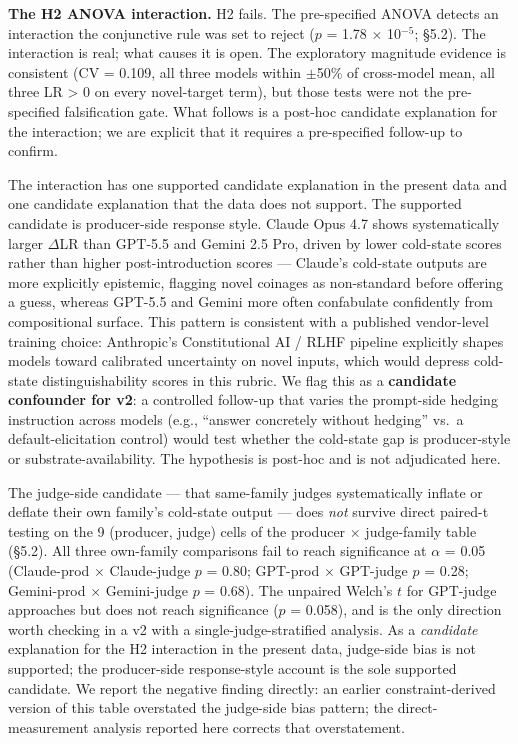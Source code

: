 \documentclass[11pt,a4paper]{article}
\begin{document}
\textbf{The H2 ANOVA interaction.} H2 fails. The pre-specified ANOVA detects an interaction the conjunctive rule was set to reject ($p$ = 1.78 $\times$ 10$^{-5}$; \S5.2). The interaction is real; what causes it is open. The exploratory magnitude evidence is consistent (CV = 0.109, all three models within $\pm$50\% of cross-model mean, all three LR > 0 on every novel-target term), but those tests were not the pre-specified falsification gate. What follows is a post-hoc candidate explanation for the interaction; we are explicit that it requires a pre-specified follow-up to confirm.

The interaction has one supported candidate explanation in the present data and one candidate explanation that the data does not support. The supported candidate is producer-side response style. Claude Opus 4.7 shows systematically larger $\Delta$LR than GPT-5.5 and Gemini 2.5 Pro, driven by lower cold-state scores rather than higher post-introduction scores --- Claude's cold-state outputs are more explicitly epistemic, flagging novel coinages as non-standard before offering a guess, whereas GPT-5.5 and Gemini more often confabulate confidently from compositional surface. This pattern is consistent with a published vendor-level training choice: Anthropic's Constitutional AI / RLHF pipeline \citep{bai2022constitutional} explicitly shapes models toward calibrated uncertainty on novel inputs, which would depress cold-state distinguishability scores in this rubric. We flag this as a \textbf{candidate confounder for v2}: a controlled follow-up that varies the prompt-side hedging instruction across models (e.g., ``answer concretely without hedging'' vs.\ a default-elicitation control) would test whether the cold-state gap is producer-style or substrate-availability. The hypothesis is post-hoc and is not adjudicated here.

The judge-side candidate --- that same-family judges systematically inflate or deflate their own family's cold-state output --- does \textit{not} survive direct paired-t testing on the 9 (producer, judge) cells of the producer $\times$ judge-family table (\S5.2). All three own-family comparisons fail to reach significance at $\alpha$ = 0.05 (Claude-prod $\times$ Claude-judge $p$ = 0.80; GPT-prod $\times$ GPT-judge $p$ = 0.28; Gemini-prod $\times$ Gemini-judge $p$ = 0.68). The unpaired Welch's $t$ for GPT-judge approaches but does not reach significance ($p$ = 0.058), and is the only direction worth checking in a v2 with a single-judge-stratified analysis. As a \textit{candidate} explanation for the H2 interaction in the present data, judge-side bias is not supported; the producer-side response-style account is the sole supported candidate. We report the negative finding directly: an earlier constraint-derived version of this table overstated the judge-side bias pattern; the direct-measurement analysis reported here corrects that overstatement.
\end{document}
